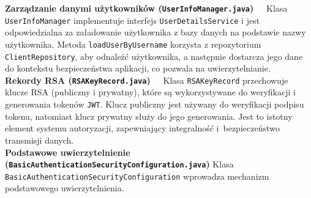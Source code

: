 \noindent \textbf{Zarządzanie danymi użytkowników (\texttt{UserInfoManager.java})~~} 
Klasa \texttt{UserInfoManager} implementuje interfejs \texttt{UserDetailsService} i jest odpowiedzialna za załadowanie użytkownika z bazy danych na podstawie nazwy użytkownika. Metoda \texttt{loadUserByUsername} korzysta z repozytorium \texttt{ClientRepository}, aby odnaleźć użytkownika, a następnie dostarcza jego dane do kontekstu bezpieczeństwa aplikacji, co pozwala na uwierzytelnianie.\\[-10pt]

\noindent \textbf{Rekordy RSA (\texttt{RSAKeyRecord.java})~~} 
Klasa \texttt{RSAKeyRecord} przechowuje klucze RSA (publiczny i prywatny), które są wykorzystywane do weryfikacji i generowania tokenów \texttt{JWT}. Klucz publiczny jest używany do weryfikacji podpisu tokenu, natomiast klucz prywatny służy do jego generowania. Jest to istotny element systemu autoryzacji, zapewniający integralność i~bezpieczeństwo transmisji danych.\\[-10pt]

\noindent \textbf{Podstawowe uwierzytelnienie (\texttt{BasicAuthenticationSecurityConfiguration.java})}
Klasa \texttt{BasicAuthenticationSecurityConfiguration} wprowadza mechanizm podstawowego uwierzytelnienia.
	
